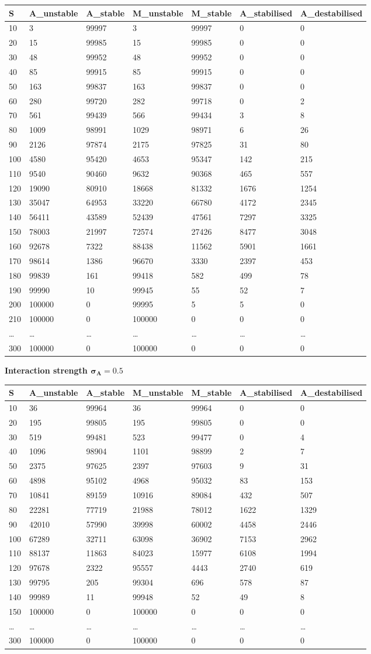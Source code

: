 \documentclass[]{article}
\begin{document}
\begin{longtable}[]{@{}lllllll@{}}
\toprule
S & A\_unstable & A\_stable & M\_unstable & M\_stable & A\_stabilised &
A\_destabilised\tabularnewline
\midrule
\endhead
10 & 3 & 99997 & 3 & 99997 & 0 & 0\tabularnewline
20 & 15 & 99985 & 15 & 99985 & 0 & 0\tabularnewline
30 & 48 & 99952 & 48 & 99952 & 0 & 0\tabularnewline
40 & 85 & 99915 & 85 & 99915 & 0 & 0\tabularnewline
50 & 163 & 99837 & 163 & 99837 & 0 & 0\tabularnewline
60 & 280 & 99720 & 282 & 99718 & 0 & 2\tabularnewline
70 & 561 & 99439 & 566 & 99434 & 3 & 8\tabularnewline
80 & 1009 & 98991 & 1029 & 98971 & 6 & 26\tabularnewline
90 & 2126 & 97874 & 2175 & 97825 & 31 & 80\tabularnewline
100 & 4580 & 95420 & 4653 & 95347 & 142 & 215\tabularnewline
110 & 9540 & 90460 & 9632 & 90368 & 465 & 557\tabularnewline
120 & 19090 & 80910 & 18668 & 81332 & 1676 & 1254\tabularnewline
130 & 35047 & 64953 & 33220 & 66780 & 4172 & 2345\tabularnewline
140 & 56411 & 43589 & 52439 & 47561 & 7297 & 3325\tabularnewline
150 & 78003 & 21997 & 72574 & 27426 & 8477 & 3048\tabularnewline
160 & 92678 & 7322 & 88438 & 11562 & 5901 & 1661\tabularnewline
170 & 98614 & 1386 & 96670 & 3330 & 2397 & 453\tabularnewline
180 & 99839 & 161 & 99418 & 582 & 499 & 78\tabularnewline
190 & 99990 & 10 & 99945 & 55 & 52 & 7\tabularnewline
200 & 100000 & 0 & 99995 & 5 & 5 & 0\tabularnewline
210 & 100000 & 0 & 100000 & 0 & 0 & 0\tabularnewline
\ldots{} & \ldots{} & \ldots{} & \ldots{} & \ldots{} & \ldots{} &
\ldots{}\tabularnewline
300 & 100000 & 0 & 100000 & 0 & 0 & 0\tabularnewline
\bottomrule
\end{longtable}

\textbf{Interaction strength \(\mathbf{\sigma_{A} = 0.5}\)}

\begin{longtable}[]{@{}lllllll@{}}
\toprule
S & A\_unstable & A\_stable & M\_unstable & M\_stable & A\_stabilised &
A\_destabilised\tabularnewline
\midrule
\endhead
10 & 36 & 99964 & 36 & 99964 & 0 & 0\tabularnewline
20 & 195 & 99805 & 195 & 99805 & 0 & 0\tabularnewline
30 & 519 & 99481 & 523 & 99477 & 0 & 4\tabularnewline
40 & 1096 & 98904 & 1101 & 98899 & 2 & 7\tabularnewline
50 & 2375 & 97625 & 2397 & 97603 & 9 & 31\tabularnewline
60 & 4898 & 95102 & 4968 & 95032 & 83 & 153\tabularnewline
70 & 10841 & 89159 & 10916 & 89084 & 432 & 507\tabularnewline
80 & 22281 & 77719 & 21988 & 78012 & 1622 & 1329\tabularnewline
90 & 42010 & 57990 & 39998 & 60002 & 4458 & 2446\tabularnewline
100 & 67289 & 32711 & 63098 & 36902 & 7153 & 2962\tabularnewline
110 & 88137 & 11863 & 84023 & 15977 & 6108 & 1994\tabularnewline
120 & 97678 & 2322 & 95557 & 4443 & 2740 & 619\tabularnewline
130 & 99795 & 205 & 99304 & 696 & 578 & 87\tabularnewline
140 & 99989 & 11 & 99948 & 52 & 49 & 8\tabularnewline
150 & 100000 & 0 & 100000 & 0 & 0 & 0\tabularnewline
\ldots{} & \ldots{} & \ldots{} & \ldots{} & \ldots{} & \ldots{} &
\ldots{}\tabularnewline
300 & 100000 & 0 & 100000 & 0 & 0 & 0\tabularnewline
\bottomrule
\end{longtable}
\end{document}
